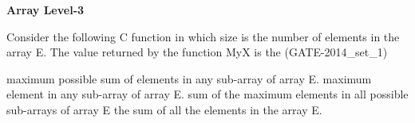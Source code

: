 \centerline{\textbf{ \LARGE Array Level-3}}

\begin{questyle}
  \question  Consider the following C function in which size is the number of elements in the array E.
            The value returned by the function MyX is the (GATE-2014\_set\_1)
            

  \begin{choices}
    \CorrectChoice  maximum possible sum of elements in any sub-array of array E.
    \choice         maximum element in any sub-array of array E.
    \choice         sum of the maximum elements in all possible sub-arrays of array E
    \choice         the sum of all the elements in the array E.
  \end{choices}
\end{questyle}

